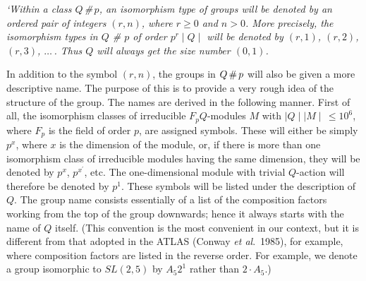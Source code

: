 {\sl `Within a class $Q$\,\#\,$p$, an  isomorphism type of groups will be
denoted by an ordered pair of integers $(r,n)$, where $r \geq 0$ and $n >
0$. More precisely, the isomorphism  types in $Q$  \#  $p$ of order  $p^r
\!\! \mid \!\! Q \!\! \mid$ will be denoted by $(r,1)$, $(r,2)$, $(r,3)$,
$\ldots\,$. Thus $Q$ will always get the size number $(0,1)$.

In  addition to the symbol $(r,n)$,  the groups in $Q  \,  {\sl \#} \, p$
will  also be given a  more descriptive name.  The purpose of  this is to
provide a very rough idea of  the structure of  the group.  The names are
derived in the following manner. First of all, the isomorphism classes of
irreducible  $F_pQ$-modules $M$ with $\mid \!\!  Q  \!\! \mid \mid \!\! M
\!\! \mid \,  \leq 10^6$,  where $F_p$ is   the field of  order $p$,  are
assigned symbols. These  will either  be simply $p^x$,  where $x$  is the
dimension of the module, or, if there is more  than one isomorphism class
of irreducible modules having the same dimension, they will be denoted by
$p^x$, $p^{x^\prime}$,  etc.   The one-dimensional  module   with trivial
$Q$-action  will therefore be denoted  by  $p^1$. These  symbols will  be
listed under the description of $Q$.  The group name consists essentially
of a list  of the composition factors  working from the  top of the group
downwards; hence  it always  starts with the  name  of $Q$ itself.  (This
convention is the most  convenient in our  context,  but it is  different
from that adopted  in the ATLAS (Conway  {\it et al}.~1985), for example,
where composition factors  are listed in the  reverse order. For example,
we denote a  group isomorphic to $SL(2,5)$  by  $A_5 2^1$ rather  than $2
\cdot A_5$.)

}
